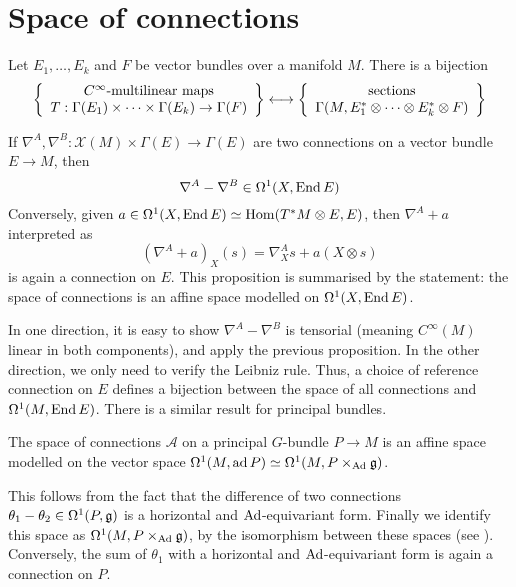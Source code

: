 \section{Space of connections}
\begin{prop}
	Let $E_1,\ldots,E_k$ and $F$ be vector bundles over a manifold  $M$. 
	There is a bijection
	\[
	\set{
		\begin{array}{c}
			C^\infty\text{-multilinear maps} \\
			T:\Gamma(E_1)\times \cdots \times \Gamma(E_k) \to \Gamma(F)
		\end{array}
	} \longleftrightarrow
	\set{
		\begin{array}{c}
			\text{sections}\\
			  \Gamma(M,E_1^*\otimes \cdots \otimes E_k^*\otimes F)
		
		\end{array}
	}
	\] 
\end{prop}
\begin{prop}
	If $\nabla^A,\nabla^B : \mathcal{X}(M) \times \Gamma(E) \to \Gamma(E)$ are
	two connections on a vector bundle $E\to M$, then 
	 \[
	\nabla^A - \nabla^B \in \Omega^1(X,\operatorname{End} E)
	\] 
	Conversely, given $a\in \Omega^1(X,\operatorname{End} E) \simeq \operatorname{Hom}(T^*M\otimes E,E)$, 
	then $\nabla^A+a$ interpreted as 
	\[
		(\nabla^A + a)_X(s) = \nabla^A_X s + a(X\otimes s)
	\] 
	is again a connection on  $E$. This proposition is summarised by the
	statement: the space of connections is an affine space modelled on
	$\Omega^1(X,\operatorname{End} E)$. 
\end{prop}
In one direction, it is easy to show $\nabla^A-\nabla^B$ is tensorial (meaning
$C^\infty(M)$ linear in both components), and apply the previous proposition. In the other
direction, we only need to verify the Leibniz rule. Thus, a choice of reference 
connection on $E$ defines a bijection between the space of all connections and
$\Omega^1(M,\operatorname{End} E)$. There is a similar result for principal bundles.

\begin{prop} \label{prop:connection_space}%
	The space of connections $\mathcal{A}$ on a principal $G$-bundle $P\to M$ 
	is an affine space modelled on 
	the vector space $\Omega^1(M,\operatorname{ad} P) \simeq \Omega^1(M,P\times_{\operatorname{Ad}} \mathfrak{g})$.
\end{prop}
This follows from the fact that the difference of two connections
$\theta_1-\theta_2\in \Omega^1(P,\operatorname{\mathfrak{g}})$ is a horizontal and $\operatorname{Ad}$-equivariant form.
Finally we identify this space as $\Omega^1(M,P\times_{\operatorname{Ad}}\operatorname{\mathfrak{g}})$, by 
the isomorphism between these spaces (see \cite[Theorem 31.9]{loringtu}). 
Conversely, the sum of $\theta_1$ with 
a horizontal and $\operatorname{Ad}$-equivariant form is again a connection on  $P$.

